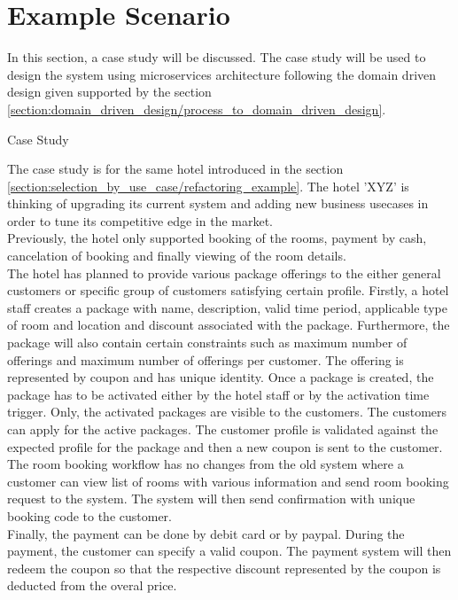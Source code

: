 \section{Example Scenario}\label{section:domain_driven_design/example_scenario}
In this section, a case study will be discussed. The case study will be used to design the system using microservices architecture following the domain driven design given supported by the section \ref{section:domain_driven_design/process_to_domain_driven_design}.

\begin{shaded} Case Study \end{shaded} \label{section:domain_driven_design/example_scenario/case_study}
The case study is for the same hotel introduced in the section \ref{section:selection_by_use_case/refactoring_example}. The hotel 'XYZ' is thinking of upgrading its current system and adding new business usecases in order to tune its competitive edge in the market.\\
Previously, the hotel only supported booking of the rooms, payment by cash, cancelation of booking and finally viewing of the room details.\\
The hotel has planned to provide various package offerings to the either general customers or specific group of customers satisfying certain profile. Firstly, a hotel staff creates a package with name, description, valid time period, applicable type of room and location and discount associated with the package. Furthermore, the package will also contain certain constraints such as maximum number of offerings and maximum number of offerings per customer. The offering is represented by coupon and has unique identity. Once a package is created, the package has to be activated either by the hotel staff or by the activation time trigger. Only, the activated packages are visible to the customers. The customers can apply for the active packages. The customer profile is validated against the expected profile for the package and then a new coupon is sent to the customer.\\
The room booking workflow has no changes from the old system where a customer can view list of rooms with various information and send room booking request to the system. The system will then send confirmation with unique booking code to the customer.\\
Finally, the payment can be done by debit card or by paypal. During the payment, the customer can specify a valid coupon. The payment system will then redeem the coupon so that the respective discount represented by the coupon is deducted from the overal price.\\
